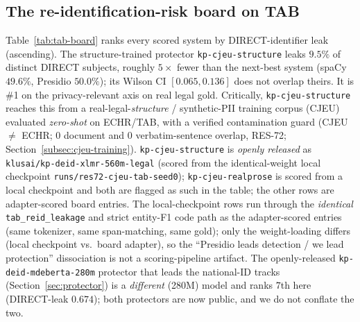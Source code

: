 \documentclass[11pt]{article}
\begin{document}
\subsection{The re-identification-risk board on TAB}
\label{sec:tab-board}
Table~\ref{tab:tab-board} ranks every scored system by DIRECT-identifier leak (ascending). The
structure-trained protector \texttt{kp-cjeu-structure} leaks $9.5\%$ of distinct DIRECT subjects,
roughly $5\times$ fewer than the next-best system (spaCy $49.6\%$, Presidio $50.0\%$); its Wilson
CI $[0.065, 0.136]$ does not overlap theirs. It is \#1 on the privacy-relevant axis on real legal
gold. Critically, \texttt{kp-cjeu-structure} reaches this from a real-legal-\emph{structure} /
synthetic-PII training corpus (CJEU) evaluated \emph{zero-shot} on ECHR/TAB, with a verified
contamination guard (CJEU $\neq$ ECHR; $0$ document and $0$ verbatim-sentence overlap, RES-72;
Section~\ref{subsec:cjeu-training}). \texttt{kp-cjeu-structure} is \emph{openly released} as
\texttt{klusai/kp-deid-xlmr-560m-legal} (scored from the identical-weight local checkpoint
\texttt{runs/res72-cjeu-tab-seed0}); \texttt{kp-cjeu-realprose} is scored from a local checkpoint and
both are flagged as such in the table; the other rows are adapter-scored board entries. The
local-checkpoint rows run through the \emph{identical} \texttt{tab\_reid\_leakage} and strict
entity-F1 code path as the adapter-scored entries (same tokenizer, same span-matching, same gold);
only the weight-loading differs (local checkpoint vs.\ board adapter), so the
``Presidio leads detection / we lead protection'' dissociation is not a scoring-pipeline artifact. The
openly-released \texttt{kp-deid-mdeberta-280m}
protector that leads the national-ID tracks (Section~\ref{sec:protector}) is a \emph{different}
(280M) model and ranks $7$th here (DIRECT-leak $0.674$); both protectors are now public, and we do
not conflate the two.
\end{document}
